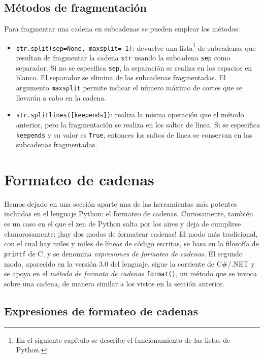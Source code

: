 \subsection{Métodos de fragmentación}

Para fragmentar una cadena en subcadenas se pueden emplear los métodos:
\begin{itemize}
	\item \texttt{str.split(sep=None, maxsplit=-1)}: devuelve una lista\footnote{En el siguiente capítulo se describe el funcionamiento de las listas de Python.} de subcadenas que resultan de fragmentar la cadena \texttt{str} usando la subcadena \texttt{sep} como separador. Si no se especifica \texttt{sep}, la separación se realiza en los espacios en blanco. El separador se elimina de las subcadenas fragmentadas. El argumento \texttt{maxsplit} permite indicar el número máximo de cortes que se llevarán a cabo en la cadena.
	\item \texttt{str.splitlines([keepends])}: realiza la misma operación que el método anterior, pero la fragmentación se realiza en los saltos de línea. Si se especifica \texttt{keepends} y su valor es \texttt{True}, entonces los saltos de línea se conservan en las subcadenas fragmentadas.
\end{itemize}

\section{Formateo de cadenas}

Hemos dejado en una sección aparte una de las herramientas más potentes incluidas en el lenguaje Python: el formateo de cadenas. Curiosamente, también es un caso en el que el zen de Python salta por los aires y deja de cumplirse clamorosamente: ¡hay dos modos de formatear cadenas! El modo más tradicional, con el cual hay miles y miles de líneas de código escritas, se basa en la filosofía de \texttt{printf} de C, y se denomina \emph{expresiones de formateo de cadenas}. El segundo modo, aparecido en la versión 3.0 del lenguaje, sigue la corriente de C\#/.NET y se apoya en el \emph{método de formato de cadenas} \texttt{format()}, un método que se invoca sobre una cadena, de manera similar a los vistos en la sección anterior.

\subsection{Expresiones de formateo de cadenas}\label{sec:expresionesFormateo}

